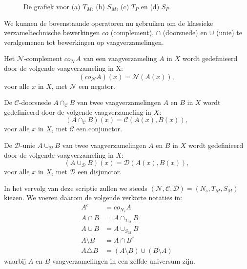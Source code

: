 \begin{figure}[bp]
\vspace{5pt}
\centering
{}
\vspace{5pt}
\caption{\label{fig:grafieken_normen}De grafiek voor (a) $T_M$, (b) $S_M$, (c) $T_P$ en 
(d) $S_P$.}
\end{figure}

We kunnen de bovenstaande operatoren nu gebruiken om de klassieke verzameltechnische bewerkingen 
$co$ (complement), $\cap$ (doorsnede) en $\cup$ (unie) te
veralgemenen tot bewerkingen op vaagverzamelingen.
\begin{definitie}
Het $\mathcal{N}$-complement $co_\mathcal{N} A$ van een vaagverzameling $A$ in $X$ wordt gedefinieerd
door de volgende vaagverzameling in X:
\begin{displaymath}
(co_\mathcal{N} A)(x) = \mathcal{N}(A(x)),
\end{displaymath}
voor alle $x$ in $X$, met $\mathcal{N}$ een negator.
\end{definitie}
\begin{definitie}
De $\mathcal{C}$-doorsnede $A \cap_\mathcal{C} B$ van twee vaagverzamelingen $A$ en $B$ in $X$
wordt gedefinieerd door de volgende vaagverzameling in $X$:
\begin{displaymath}
(A \cap_\mathcal{C} B)(x) = \mathcal{C}(A(x),B(x)),
\end{displaymath}
voor alle $x$ in $X$, met $\mathcal{C}$ een conjunctor.
\end{definitie}
\begin{definitie}
De $\mathcal{D}$-unie $A \cup_\mathcal{D} B$ van twee vaagverzamelingen $A$ en $B$ in $X$ wordt gedefinieerd door de
volgende vaagverzameling in $X$:
\begin{displaymath}
(A \cup_\mathcal{D} B)(x) = \mathcal{D}(A(x),B(x)),
\end{displaymath}
voor alle $x$ in $X$, met $\mathcal{D}$ een disjunctor.
\end{definitie}

In het vervolg van deze scriptie zullen we steeds 
$(\mathcal{N},\mathcal{C},\mathcal{D})=(N_s,T_M,S_M)$ kiezen. We voeren daarom de volgende
verkorte notaties in:
\begin{align*}
A^c 			&= co_{N_s} A \\
A \cap B 		&= A \cap_{T_M} B \\
A \cup B		&= A \cup_{S_M} B \\
A \setminus B  	&= A \cap B^c \\
A \triangle B 	&= (A \setminus B) \cup (B \setminus A)
\end{align*}
waarbij $A$ en $B$ vaagverzamelingen in een zelfde universum zijn.


